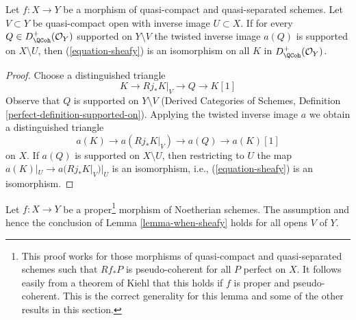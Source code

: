 \begin{lemma}
\label{lemma-when-sheafy}
Let $f : X \to Y$ be a morphism of quasi-compact and quasi-separated
schemes. Let $V \subset Y$ be quasi-compact open with inverse image
$U \subset X$. If for every $Q \in D_\QCoh^+(\mathcal{O}_Y)$
supported on $Y \setminus V$ the twisted inverse image $a(Q)$
is supported on $X \setminus U$, then (\ref{equation-sheafy})
is an isomorphism on all $K$ in $D_\QCoh^+(\mathcal{O}_Y)$.
\end{lemma}

\begin{proof}
Choose a distinguished triangle
$$
K \to Rj_*K|_V \to Q \to K[1]
$$
Observe that $Q$ is supported on $Y \setminus V$
(Derived Categories of Schemes, Definition
\ref{perfect-definition-supported-on}).
Applying the twisted inverse image $a$ we obtain a distinguished triangle
$$
a(K) \to a(Rj_*K|_V) \to a(Q) \to a(K)[1]
$$
on $X$. If $a(Q)$ is supported on $X \setminus U$, then
restricting to $U$ the map $a(K)|_U \to a(Rj_*K|_V)|_U$ is an
isomorphism, i.e., (\ref{equation-sheafy}) is an isomorphism.
\end{proof}

\begin{lemma}
\label{lemma-proper-noetherian}
Let $f : X \to Y$ be a proper\footnote{This proof works for those
morphisms of quasi-compact and quasi-separated schemes such that
$Rf_*P$ is pseudo-coherent for all $P$ perfect on $X$. It follows
easily from a theorem of Kiehl \cite{Kiehl} that this holds if
$f$ is proper and pseudo-coherent. This is the correct generality
for this lemma and some of the other results in this section.}
morphism of Noetherian schemes.
The assumption and hence the conclusion of
Lemma \ref{lemma-when-sheafy} holds for all opens $V$ of $Y$.
\end{lemma}


